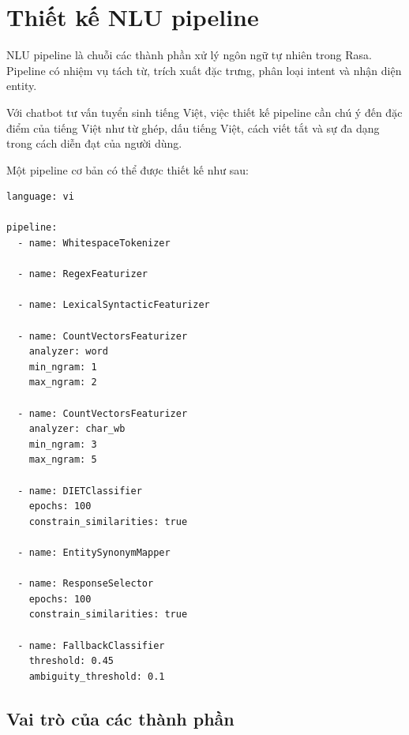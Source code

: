 ﻿\section{Thiết kế NLU pipeline}

NLU pipeline là chuỗi các thành phần xử lý ngôn ngữ tự nhiên trong Rasa. Pipeline có nhiệm vụ tách từ, trích xuất đặc trưng, phân loại intent và nhận diện entity.

Với chatbot tư vấn tuyển sinh tiếng Việt, việc thiết kế pipeline cần chú ý đến đặc điểm của tiếng Việt như từ ghép, dấu tiếng Việt, cách viết tắt và sự đa dạng trong cách diễn đạt của người dùng.

Một pipeline cơ bản có thể được thiết kế như sau:

\begin{verbatim}
language: vi

pipeline:
  - name: WhitespaceTokenizer

  - name: RegexFeaturizer

  - name: LexicalSyntacticFeaturizer

  - name: CountVectorsFeaturizer
    analyzer: word
    min_ngram: 1
    max_ngram: 2

  - name: CountVectorsFeaturizer
    analyzer: char_wb
    min_ngram: 3
    max_ngram: 5

  - name: DIETClassifier
    epochs: 100
    constrain_similarities: true

  - name: EntitySynonymMapper

  - name: ResponseSelector
    epochs: 100
    constrain_similarities: true

  - name: FallbackClassifier
    threshold: 0.45
    ambiguity_threshold: 0.1
\end{verbatim}

\subsection*{Vai trò của các thành phần}

